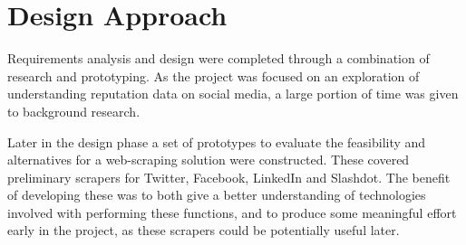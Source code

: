 





\section{Design Approach}

Requirements analysis and design were completed through a combination of research and prototyping. As the project was focused on an exploration of understanding reputation data on social media, a large portion of time was given to background research.

Later in the design phase a set of prototypes to evaluate the feasibility and alternatives for a web-scraping solution were constructed. These covered preliminary scrapers for Twitter, Facebook, LinkedIn and Slashdot. The benefit of developing these was to both give a better understanding of technologies involved with performing these functions, and to produce some meaningful effort early in the project, as these scrapers could be potentially useful later. 





